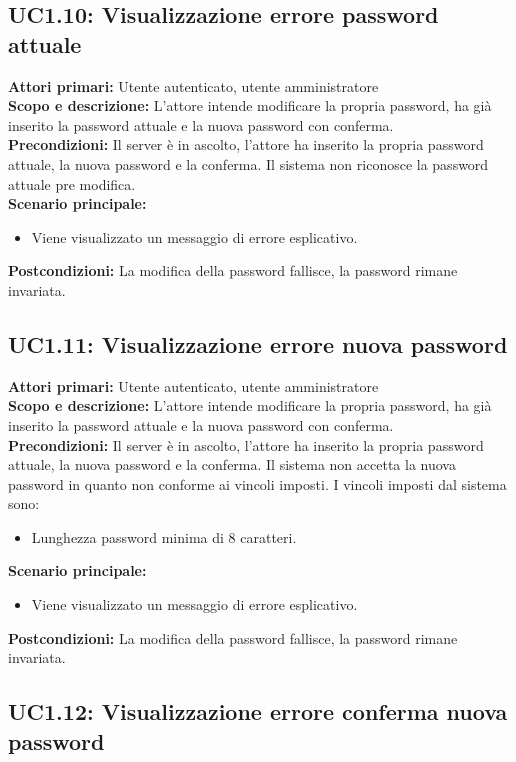 \documentclass{scalatekids-article}
\begin{document}
\subsection{UC1.10: Visualizzazione errore password attuale}

\textbf{Attori primari:} Utente autenticato, utente amministratore\\
\textbf{Scopo e descrizione:} L'attore intende modificare la propria password, ha già inserito la password attuale e la nuova password con conferma.\\
\textbf{Precondizioni:} Il server è in ascolto, l'attore ha inserito la propria password attuale, la nuova password e la conferma. Il sistema non riconosce la password attuale pre modifica.\\
\textbf{Scenario principale:}
\begin{itemize}
\item Viene visualizzato un messaggio di errore esplicativo.
\end{itemize}
\textbf{Postcondizioni:} La modifica della password fallisce, la password rimane invariata.

\subsection{UC1.11: Visualizzazione errore nuova password}

\textbf{Attori primari:} Utente autenticato, utente amministratore\\
\textbf{Scopo e descrizione:} L'attore intende modificare la propria password, ha già inserito la password attuale e la nuova password con conferma.\\
\textbf{Precondizioni:} Il server è in ascolto, l'attore ha inserito la propria password attuale, la nuova password e la conferma. Il sistema non accetta la nuova password in quanto non conforme ai
vincoli imposti. I vincoli imposti dal sistema sono:
\begin{itemize}
\item Lunghezza password minima di 8 caratteri.
\end{itemize}
\textbf{Scenario principale:}
\begin{itemize}
\item Viene visualizzato un messaggio di errore esplicativo.
\end{itemize}
\textbf{Postcondizioni:} La modifica della password fallisce, la password rimane invariata.

\subsection{UC1.12: Visualizzazione errore conferma nuova password}
\end{document}
